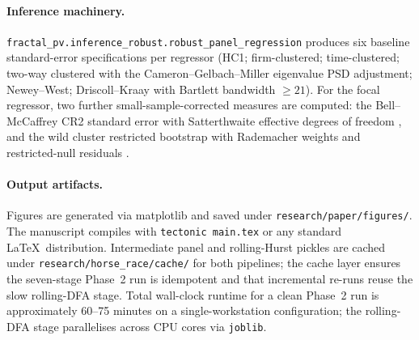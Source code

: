 \documentclass[preprint,12pt,authoryear]{elsarticle}
\begin{document}
\paragraph{Inference machinery.} \texttt{fractal\_pv.inference\_robust.robust\_panel\_regression} produces six baseline standard-error specifications per regressor (HC1; firm-clustered; time-clustered; two-way clustered with the Cameron--Gelbach--Miller eigenvalue PSD adjustment; Newey--West; Driscoll--Kraay with Bartlett bandwidth $\geq 21$). For the focal regressor, two further small-sample-corrected measures are computed: the Bell--McCaffrey CR2 standard error with Satterthwaite effective degrees of freedom \citep{imbens2016robust}, and the wild cluster restricted bootstrap with Rademacher weights and restricted-null residuals \citep{cameron2008bootstrap, mackinnon2017wild}.

\paragraph{Output artifacts.} Figures are generated via matplotlib and saved under \texttt{research/paper/figures/}. The manuscript compiles with \texttt{tectonic main.tex} or any standard \LaTeX\ distribution. Intermediate panel and rolling-Hurst pickles are cached under \texttt{research/horse\_race/cache/} for both pipelines; the cache layer ensures the seven-stage Phase~2 run is idempotent and that incremental re-runs reuse the slow rolling-DFA stage. Total wall-clock runtime for a clean Phase~2 run is approximately 60--75 minutes on a single-workstation configuration; the rolling-DFA stage parallelises across CPU cores via \texttt{joblib}.



\end{document}
